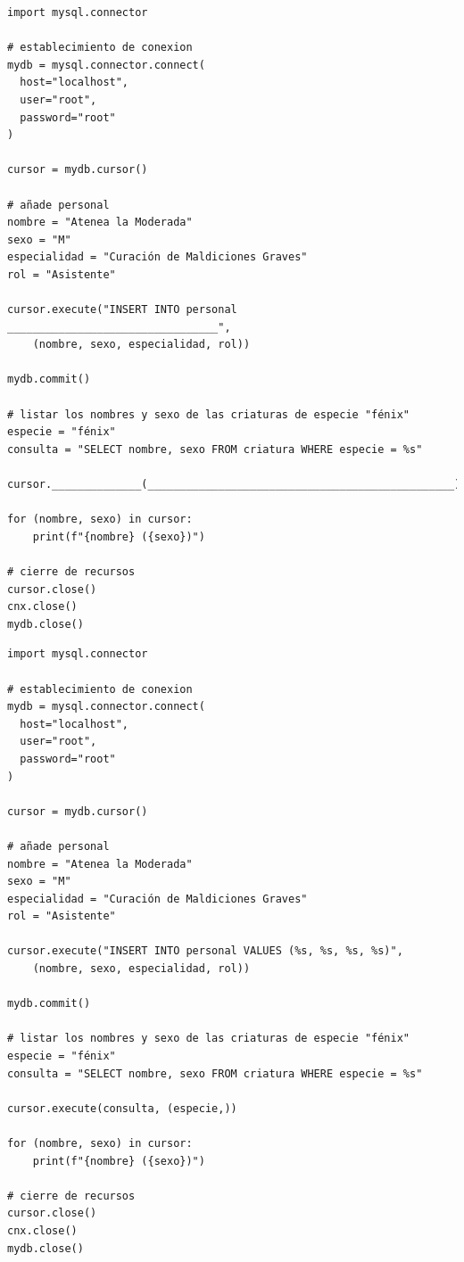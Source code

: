 \documentclass[12pt,a4paper,addpoints,answers]{exam}
\begin{document}
\begin{questions}
\begin{parts}
\begin{verbatim}
import mysql.connector

# establecimiento de conexion
mydb = mysql.connector.connect(
  host="localhost",
  user="root",
  password="root"
)

cursor = mydb.cursor()

# añade personal
nombre = "Atenea la Moderada"
sexo = "M"
especialidad = "Curación de Maldiciones Graves"
rol = "Asistente"

cursor.execute("INSERT INTO personal _________________________________",
    (nombre, sexo, especialidad, rol))

mydb.commit()

# listar los nombres y sexo de las criaturas de especie "fénix"
especie = "fénix"
consulta = "SELECT nombre, sexo FROM criatura WHERE especie = %s"

cursor.______________(________________________________________________)

for (nombre, sexo) in cursor:
    print(f"{nombre} ({sexo})")

# cierre de recursos
cursor.close()
cnx.close()
mydb.close()

\end{verbatim}

\begin{solution}[1em]
\begin{verbatim}
import mysql.connector

# establecimiento de conexion
mydb = mysql.connector.connect(
  host="localhost",
  user="root",
  password="root"
)

cursor = mydb.cursor()

# añade personal
nombre = "Atenea la Moderada"
sexo = "M"
especialidad = "Curación de Maldiciones Graves"
rol = "Asistente"

cursor.execute("INSERT INTO personal VALUES (%s, %s, %s, %s)",
    (nombre, sexo, especialidad, rol))

mydb.commit()

# listar los nombres y sexo de las criaturas de especie "fénix"
especie = "fénix"
consulta = "SELECT nombre, sexo FROM criatura WHERE especie = %s"

cursor.execute(consulta, (especie,))

for (nombre, sexo) in cursor:
    print(f"{nombre} ({sexo})")

# cierre de recursos
cursor.close()
cnx.close()
mydb.close()
\end{verbatim}
\end{solution}


\end{parts}
\end{questions}
\end{document}
